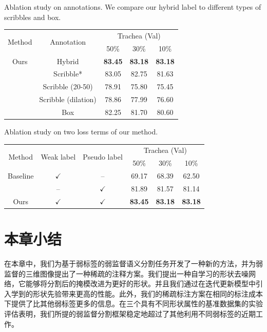 \begin{table}[t!]
    \centering    
    {Ablation study on annotations. We compare our hybrid label to different types of scribbles and box.}
    \begin{tabular}[t]{c c|c c c}
        \toprule
        \multirow{2}{*}{Method} & \multirow{2}{*}{Annotation} & \multicolumn{3}{c}{Trachea (Val)} \\ %
        &                        & 50\% & 30\% & 10\%                 \\ \midrule            
        Ours &   Hybrid  & \textbf{83.45} & \textbf{83.18} & \textbf{83.18} \\
        & Scribble*      & 83.05  & 82.75 & 81.63 \\
        & Scribble (20-50)      & 78.91 & 75.80 & 75.45 \\ %
        & Scribble (dilation)      & 78.86 & 77.99 & 76.60 \\
        & Box                   & 82.25 & 81.70 & 80.60 \\
        \bottomrule 
    \end{tabular}
    \label{tab:ablate2}
\end{table}

\begin{table}[t!]
	\centering
    {Ablation study on two loss terms of our method.}
	\label{tab:ablate_loss}        
		\begin{tabular}[t]{c c c|c c c}
			\toprule
			\multirow{2}{*}{Method} & \multirow{2}{*}{Weak label} & \multirow{2}{*}{Pseudo label}  & \multicolumn{3}{c}{Trachea (Val)} \\ %
			&                       &              & 50\% & 30\% & 10\%                 \\ \midrule
			Baseline  & $\checkmark$  & --      & 69.17 & 68.39 & 62.50 \\
			& --      & $\checkmark$  & 81.89 & 81.57 & 81.14 \\
			Ours      & $\checkmark$  & $\checkmark$      & \textbf{83.45} & \textbf{83.18} & \textbf{83.18} \\
			\bottomrule 
		\end{tabular}
\end{table}


\section{本章小结}
在本章中，我们为基于弱标签的弱监督语义分割任务开发了一种新的方法，并为弱监督的三维图像提出了一种稀疏的注释方案。我们提出一种自学习的形状去噪网络，它能够将分割后的掩模改进为更好的形状。并且我们通过在迭代更新模型中引入学到的形状先验带来更高的性能。此外，我们的稀疏标注方案在相同的标注成本下提供了比其他弱标签更多的信息。在三个具有不同形状属性的基准数据集的实验评估表明，我们所提的弱监督分割框架稳定地超过了其他利用不同弱标签的近期工作。